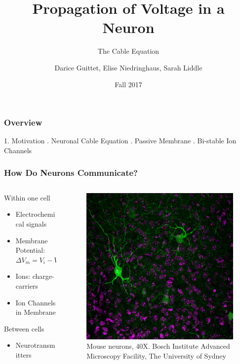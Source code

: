 \documentclass{beamer}
\title{Propagation of Voltage in a Neuron}
\subtitle{The Cable Equation}
\author{Darice Guittet, Elise Niedringhaus, Sarah Liddle}
\date{Fall 2017}
\begin{document}
 
\frame{\titlepage}
 
\begin{frame}
\frametitle{Overview}
1. Motivation \newline {}. Neuronal Cable Equation \newline {}. Passive Membrane \newline {}. Bi-stable Ion Channels
\end{frame}

\begin{frame}
\frametitle{How Do Neurons Communicate?}
\begin{columns}
    \begin{column}{.5\textwidth}
    Within one cell
    \begin{itemize}
	\item Electrochemical signals
	\item Membrane Potential: $\Delta V_m = V_i - V_e$
	\item Ions: charge-carriers
	\item Ion Channels in Membrane \newline
	\end{itemize}
	Between cells
	\begin{itemize}
	\item Neurotransmitters
\end{itemize}
    \end{column}
    
    \begin{column}{.5\textwidth}
    \begin{figure}[H]\label{neuron}
    \includegraphics[width=\textwidth]{OConnor-InhibitoryInterneurons1}
	\caption{Mouse neurons, 40X. Bosch Institute Advanced Microscopy Facility, The University of Sydney}
    \end{figure}
    

\end{column}
\end{columns}
\end{frame}
\end{document}
